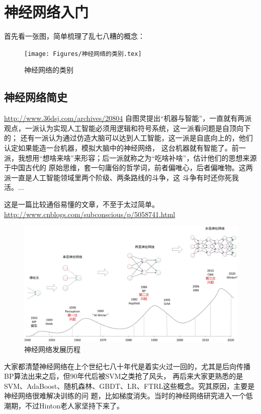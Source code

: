 \chapter{神经网络入门}
首先看一张图，简单梳理了乱七八糟的概念：
\begin{figure}
  \centering
  \texttt{[image: Figures/神经网络的类别.tex]}
  \caption{神经网络的类别}\label{神经网络的类别}
\end{figure}

\section{神经网络简史}
\url{http://www.36dsj.com/archives/20804}
自图灵提出“机器与智能”，一直就有两派观点，一派认为实现人工智能必须用逻辑和符号系统，这一派看问题是自顶向下的；
还有一派认为通过仿造大脑可以达到人工智能，这一派是自底向上的，他们认定如果能造一台机器，模拟大脑中的神经网络，
这台机器就有智能了。前一派，我想用“想啥来啥”来形容；后一派就称之为“吃啥补啥”，估计他们的思想来源于中国古代的
原始思维，套一句庸俗的哲学词，前者偏唯心，后者偏唯物。这两派一直是人工智能领域里两个阶级、两条路线的斗争，这
斗争有时还你死我活。...


这是一篇比较通俗易懂的文章，不至于太过简单。\url{http://www.cnblogs.com/subconscious/p/5058741.html}
\begin{figure}
  \centering
  \includegraphics[width=15cm]{Figures/神经网络发展历程.jpg}
  \caption{神经网络发展历程}\label{神经网络发展历程}
\end{figure}

大家都清楚神经网络在上个世纪七八十年代是着实火过一回的，尤其是后向传播BP算法出来之后，但90年代后被SVM之类抢了风头，
再后来大家更熟悉的是SVM、AdaBoost、随机森林、GBDT、LR、FTRL这些概念。究其原因，主要是神经网络很难解决训练的问
题，比如梯度消失。当时的神经网络研究进入一个低潮期，不过Hinton老人家坚持下来了。

